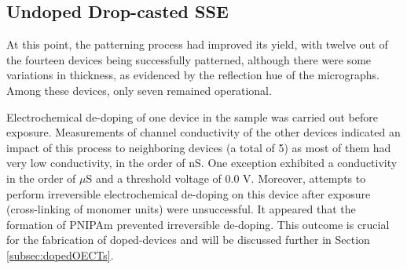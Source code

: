
\subsection{Undoped Drop-casted SSE}%
At this point, the patterning process had improved its yield, with twelve out of the fourteen devices being successfully patterned, although there were some variations in thickness, as evidenced by the reflection hue of the micrographs. Among these devices, only seven remained operational.

Electrochemical de-doping of one device in the sample was carried out before exposure. Measurements of channel conductivity of the other devices indicated an impact of this process to neighboring devices (a total of 5) as most of them had very low conductivity, in the order of nS. One exception exhibited a conductivity in the order of $\mu$S and a threshold voltage of 0.0 V. Moreover, attempts to perform irreversible electrochemical de-doping on this device after exposure (cross-linking of monomer units) were unsuccessful. It appeared that the formation of PNIPAm prevented irreversible de-doping. This outcome is crucial for the fabrication of doped-devices and will be discussed further in Section \ref{subsec:dopedOECTs}.

